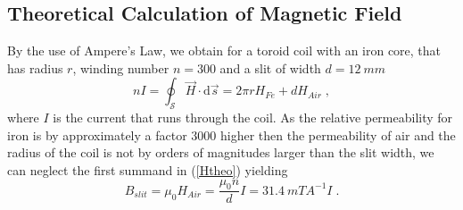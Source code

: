 \documentclass[a4paper]{scrartcl}
\numberwithin{equation}{section}
\numberwithin{figure}{section}
\numberwithin{table}{section}
\newcommand{\eq}[2]{\begin{equation}#1\label{#2}\end{equation}}
\newcommand{\Formel}[1]{(\ref{#1})}
\begin{document}
\subsection{Theoretical Calculation of Magnetic Field}
By the use of Ampere's Law, we obtain for a toroid coil with an iron core, that has radius $r$, winding number $n=300$ and a slit of width $d=\SI{12}{mm}$
\eq{nI=\oint_{\mathcal S} \vec{H} \cdot \mathrm{d}\vec{s} = 2 \pi r H_{Fe} + d H_{Air} \;, }{Htheo}
where $I$ is the current that runs through the coil. As the relative permeability for iron is by approximately a factor $3000$ higher then the permeability of air and the radius of the coil is not by orders of magnitudes larger than the slit width, we can neglect the first summand in \Formel{Htheo} yielding
\eq{B_{slit} =  \mu_0  H_{Air}= \frac{\mu_0 n}{d} I = \SI{31.4}{mT A^{-1}} I \; .}{}

 


 

\end{document}
